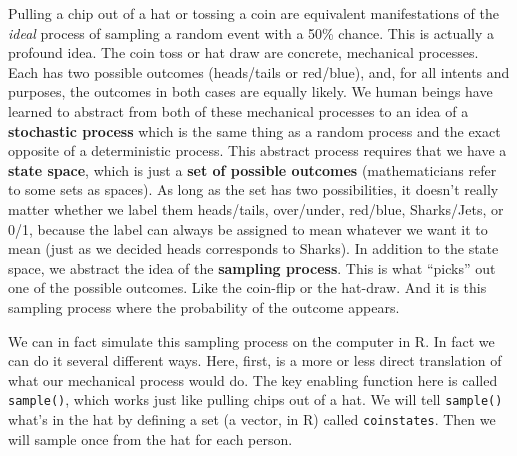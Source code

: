 \documentclass[
  openany]{book}
\begin{document}
Pulling a chip out of a hat or tossing a coin are equivalent manifestations of the \emph{ideal} process of sampling a random event with a 50\% chance. This is actually a profound idea. The coin toss or hat draw are concrete, mechanical processes. Each has two possible outcomes (heads/tails or red/blue), and, for all intents and purposes, the outcomes in both cases are equally likely. We human beings have learned to abstract from both of these mechanical processes to an idea of a \textbf{stochastic process} which is the same thing as a random process and the exact opposite of a deterministic process. This abstract process requires that we have a \textbf{state space}, which is just a \textbf{set of possible outcomes} (mathematicians refer to some sets as spaces). As long as the set has two possibilities, it doesn't really matter whether we label them heads/tails, over/under, red/blue, Sharks/Jets, or 0/1, because the label can always be assigned to mean whatever we want it to mean (just as we decided heads corresponds to Sharks). In addition to the state space, we abstract the idea of the \textbf{sampling process}. This is what ``picks'' out one of the possible outcomes. Like the coin-flip or the hat-draw. And it is this sampling process where the probability of the outcome appears.

We can in fact simulate this sampling process on the computer in R. In fact we can do it several different ways. Here, first, is a more or less direct translation of what our mechanical process would do. The key enabling function here is called \texttt{sample()}, which works just like pulling chips out of a hat. We will tell \texttt{sample()} what's in the hat by defining a set (a vector, in R) called \texttt{coinstates}. Then we will sample once from the hat for each person.
\end{document}
